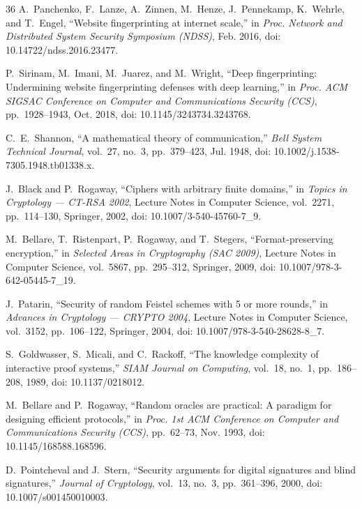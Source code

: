 \documentclass[conference,10pt]{IEEEtran}
\begin{document}
\begin{thebibliography}{36}
A.~Panchenko, F.~Lanze, A.~Zinnen, M.~Henze, J.~Pennekamp, K.~Wehrle, and T.~Engel, ``Website fingerprinting at internet scale,'' in \emph{Proc. Network and Distributed System Security Symposium (NDSS)}, Feb. 2016, doi: 10.14722/ndss.2016.23477.

P.~Sirinam, M.~Imani, M.~Juarez, and M.~Wright, ``Deep fingerprinting: Undermining website fingerprinting defenses with deep learning,'' in \emph{Proc. ACM SIGSAC Conference on Computer and Communications Security (CCS)}, pp.~1928--1943, Oct. 2018, doi: 10.1145/3243734.3243768.

C.~E.~Shannon, ``A mathematical theory of communication,'' \emph{Bell System Technical Journal}, vol.~27, no.~3, pp.~379--423, Jul. 1948, doi: 10.1002/j.1538-7305.1948.tb01338.x.

J.~Black and P.~Rogaway, ``Ciphers with arbitrary finite domains,'' in \emph{Topics in Cryptology --- CT-RSA 2002}, Lecture Notes in Computer Science, vol.~2271, pp.~114--130, Springer, 2002, doi: 10.1007/3-540-45760-7\_9.

M.~Bellare, T.~Ristenpart, P.~Rogaway, and T.~Stegers, ``Format-preserving encryption,'' in \emph{Selected Areas in Cryptography (SAC 2009)}, Lecture Notes in Computer Science, vol.~5867, pp.~295--312, Springer, 2009, doi: 10.1007/978-3-642-05445-7\_19.

J.~Patarin, ``Security of random Feistel schemes with 5 or more rounds,'' in \emph{Advances in Cryptology --- CRYPTO 2004}, Lecture Notes in Computer Science, vol.~3152, pp.~106--122, Springer, 2004, doi: 10.1007/978-3-540-28628-8\_7.

S.~Goldwasser, S.~Micali, and C.~Rackoff, ``The knowledge complexity of interactive proof systems,'' \emph{SIAM Journal on Computing}, vol.~18, no.~1, pp.~186--208, 1989, doi: 10.1137/0218012.

M.~Bellare and P.~Rogaway, ``Random oracles are practical: A paradigm for designing efficient protocols,'' in \emph{Proc. 1st ACM Conference on Computer and Communications Security (CCS)}, pp.~62--73, Nov. 1993, doi: 10.1145/168588.168596.

D.~Pointcheval and J.~Stern, ``Security arguments for digital signatures and blind signatures,'' \emph{Journal of Cryptology}, vol.~13, no.~3, pp.~361--396, 2000, doi: 10.1007/s001450010003.


\end{thebibliography}
\end{document}
